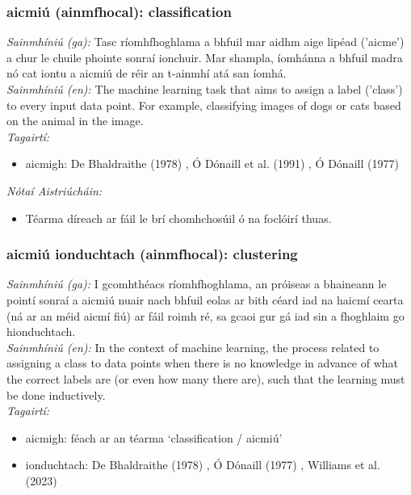 \subsubsection*{aicmiú (ainmfhocal): classification}
 \noindent \textit{Sainmhíniú (ga):} Tasc ríomhfhoghlama a bhfuil mar aidhm aige lipéad ('aicme') a chur le chuile phointe sonraí ionchuir. Mar shampla, íomhánna a bhfuil madra nó cat iontu a aicmiú de réir an t-ainmhí atá san íomhá.
\\
 \noindent \textit{Sainmhíniú (en):} The machine learning task that aims to assign a label ('class') to every input data point. For example, classifying images of dogs or cats based on the animal in the image.
\\
 \noindent \textit{Tagairtí:}
\begin{itemize}
	\item aicmigh: De Bhaldraithe (1978) \cite{de-bhaldraithe}, Ó Dónaill et al. (1991) \cite{focloir-beag}, Ó Dónaill (1977) \cite{odonaill}
\end{itemize}

 \noindent \textit{Nótaí Aistriúcháin:}
\begin{itemize}
	\item Téarma díreach ar fáil le brí chomhchosúil ó na foclóirí thuas.
\end{itemize}


\subsubsection*{aicmiú ionduchtach (ainmfhocal): clustering}
 \noindent \textit{Sainmhíniú (ga):} I gcomhthéacs ríomhfhoghlama, an próiseas a bhaineann le pointí sonraí a aicmiú nuair nach bhfuil eolas ar bith céard iad na haicmí cearta (ná ar an méid aicmí fiú) ar fáil roimh ré, sa gcaoi gur gá iad sin a fhoghlaim go hionduchtach.
\\
 \noindent \textit{Sainmhíniú (en):} In the context of machine learning, the process related to assigning a class to data points when there is no knowledge in advance of what the correct labels are (or even how many there are), such that the learning must be done inductively.
\\
 \noindent \textit{Tagairtí:}
\begin{itemize}
	\item aicmigh: féach ar an téarma `classification / aicmiú'
	\item ionduchtach: De Bhaldraithe (1978) \cite{de-bhaldraithe}, Ó Dónaill (1977) \cite{odonaill}, Williams et al. (2023) \cite{storchiste}
\end{itemize}


